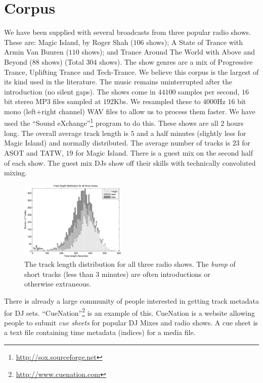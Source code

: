 \documentclass[twocolumn]{article}
\begin{document}
	\section{Corpus}\label{dataset}
	
	We have been supplied with several broadcasts from three popular radio shows. These are: Magic Island, by Roger Shah ($106$ shows); A State of Trance with Armin Van Buuren ($110$ shows); and Trance Around The World with Above and Beyond ($88$ shows) (Total $304$ shows). The show genres are a mix of Progressive Trance, Uplifting Trance and Tech-Trance. We believe this corpus is the largest of its kind used \cite{peiszer2008automatic} in the literature.  
	The music remains uninterrupted after the introduction (no silent gaps). 
	The shows come in $44100$ samples per second, $16$ bit stereo MP3 files sampled at $192$Kbs. We resampled these to $4000$Hz $16$ bit mono (left+right channel) WAV files to allow us to process them faster. We have used the ``Sound eXchange''\footnote{\url{http://sox.sourceforge.net}}  program to do this. These shows are all $2$ hours long. The overall average track length is $5$ and a half minutes (slightly less for Magic Island) and normally distributed. The average number of tracks is $23$ for ASOT and TATW, $19$ for Magic Island. There is a guest mix on the second half of each show. The guest mix DJs show off their skills with technically convoluted mixing.
	
	\begin{figure}
		\centering
		\includegraphics[width=0.45\textwidth]{images/tracklength.pdf}
		
		\caption{The track length distribution for all three radio shows. The \textit{bump} of short tracks (less than $3$ minutes) are often introductions or otherwise extraneous.}
		\label{fig:tracklengths}
	\end{figure} 
	
	There is already a large community of people interested in getting track metadata for DJ sets. ``CueNation''\footnote{\url{http://www.cuenation.com}} is an example of this. CueNation is a website allowing people to submit \textit{cue sheets} for popular DJ Mixes and radio shows. A cue sheet is a text file containing time metadata (indices) for a media file.
	
\end{document}
